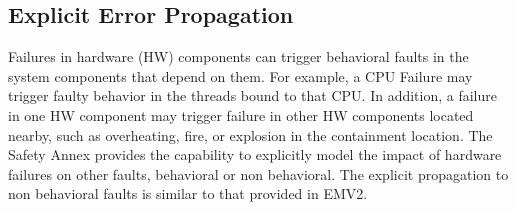 \subsection{Explicit %
	Error Propagation} 
Failures in hardware (HW) components can trigger behavioral faults in the system components that depend on them. For example, a CPU %
Failure may trigger faulty behavior in the threads bound to that CPU. In addition, a %
failure in one HW component may trigger %
failure in other HW components located nearby, such as overheating, fire, or explosion
in the containment location. 
The Safety Annex provides the capability to explicitly model the impact of hardware %
failures on other faults, behavioral or non behavioral. The explicit propagation to non behavioral faults is similar to that provided in EMV2.

